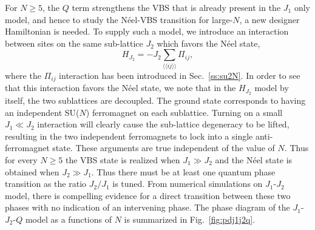 \documentclass[range]{ar2e}
\begin{document}
For $N\geq 5$, the $Q$ term strengthens
the VBS that is already present in the $J_1$ only model, and hence to
study the N\'eel-VBS transition for large-$N$, a new designer
Hamiltonian is needed. 
 To supply such a model, we
introduce an interaction between sites on the same sub-lattice $J_2$ which favors the N\'eel state,
\begin{equation}
H_{J_2}= -J_2 \sum_{\langle\langle ij\rangle\rangle} \Pi_{ij},
\end{equation}
where the $\Pi_{ij}$ interaction has been introduced in Sec.~\ref{ss:su2N}.
In order to see that this interaction favors the N\'eel state, we note
that in the $H_{J_2}$ model by itself, the two sublattices are
decoupled. The ground state corresponds to having an independent SU($N$) ferromagnet on
each sublattice. Turning on a small $J_1\ll J_2$ interaction will clearly cause
the sub-lattice degeneracy to be lifted, resulting in the
two independent ferromagnets to lock into a single
anti-ferromagnet state. These arguments are true independent of the
value of $N$. Thus for every $N\geq 5$ the VBS state is
realized when $J_1\gg J_2$ and the N\'eel state is obtained when $J_2
\gg J_1$. Thus there must be at least one quantum phase transition as
the ratio
$J_2/J_1$ is tuned. From numerical simulations on $J_1$-$J_2$ model, there is compelling evidence
for a direct transition between these two phases with no
indication of an intervening phase. The phase diagram of the $J_1$-$J_2$-$Q$ model as a functions of $N$ is summarized in Fig.~\ref{fig:pdj1j2q}.
\end{document}
